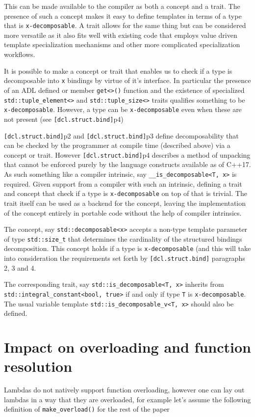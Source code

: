 \documentclass{article}
\begin{document}
This can be made available to the compiler as both a concept and a trait.  The
presence of such a concept makes it easy to define templates in terms of a
type that is \texttt{x-decomposable}.  A trait allows for the same thing but
can be considered more versatile as it also fits well with existing code that
employs value driven template specialization mechanisms and other more
complicated specialization workflows.

It is possible to make a concept or trait that enables us to check if a type
is decomposable into \texttt{x} bindings by virtue of it's interface.  In
particular the presence of an ADL defined or member \texttt{get<>()} function
and the existence of specialized \texttt{std::tuple\_element<>} and
\texttt{std::tuple\_size<>} traits qualifies something to be
\texttt{x-decomposable}.  However, a type can be \texttt{x-decomposable} even
when these are not present (see \texttt{[dcl.struct.bind]}p4)

\texttt{[dcl.struct.bind]}p2 and \texttt{[dcl.struct.bind]}p3 define
decomposability that can be checked by the programmer at compile time
(described above) via a concept or trait.  However
\texttt{[dcl.struct.bind]}p4 describes a method of unpacking that cannot be
enforced purely by the language constructs available as of C++17.  As such
something like a compiler intrinsic, say \texttt{\_\_is\_decomposable<T, x>}
is required.  Given support from a compiler with such an intrinsic, defining a
trait and concept that check if a type is \texttt{x-decomposable} on top of
that is trivial.  The trait itself can be used as a backend for the concept,
leaving the implementation of the concept entirely in portable code without
the help of compiler intrinsics.

The concept, say \texttt{std::decomposable<x>} accepts a non-type template
parameter of type \texttt{std::size\_t} that determines the cardinality of the
structured bindings decomposition.  This concept holds if a type is
\texttt{x-decomposable} (and this will take into consideration the
requirements set forth by \texttt{[dcl.struct.bind]} paragraphs 2, 3 and 4.

The corresponding trait, say \texttt{std::is\_decomposable<T, x>} inherits
from \texttt{std::integral\_constant<bool, true>} if and only if type
\texttt{T} is \texttt{x-decomposable}.  The usual variable template
\texttt{std::is\_decomposable\_v<T, x>} should also be defined.

\section{Impact on overloading and function resolution}
Lambdas do not natively support function overloading, however one can lay out
lambdas in a way that they are overloaded, for example let's assume the
following definition of \texttt{make\_overload()} for the rest of the paper
\end{document}
